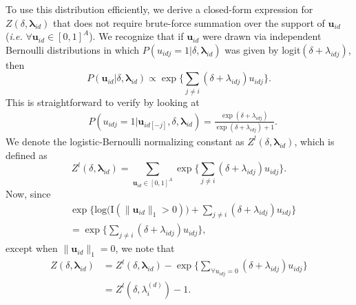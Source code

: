 \documentclass{article}
\begin{document}
 	 To use this distribution efficiently, we derive a closed-form expression for $Z(\delta,\boldsymbol{\lambda}_{id})$ that does not require brute-force summation over the support of $\boldsymbol{u}_{id}$ (\textit{i.e.} $\forall \boldsymbol{u}_{id} \in [0,1]^A$). We recognize that if $\boldsymbol{u}_{id}$ were drawn via independent Bernoulli distributions in which $P({u}_{idj}=1|\delta, \boldsymbol{\lambda}_{id})$ was given by logit$(\delta+\lambda_{idj})$, then 
 	 \begin{equation*}
 	 	P(\boldsymbol{u}_{id}|\delta, \boldsymbol{\lambda}_{id}) \propto \exp\Big\{\sum_{j \neq i } (\delta+\lambda_{idj})u_{idj}\Big\}.  	 
 	 \end{equation*}
 	 This is straightforward to verify by looking at 
 	 \begin{equation*}
 	 	\begin{aligned}
 	 		&P(u_{idj}=1|\boldsymbol{u}_{id[-j]}, \delta, \boldsymbol{\lambda}_{id})
 	 		=\frac{ \exp{(\delta+\lambda_{idj})}}{\exp{(\delta+\lambda_{idj})} + 1}.\end{aligned}\end{equation*}
 	 We denote the logistic-Bernoulli normalizing constant as $Z^{l}(\delta,\boldsymbol{\lambda}_{id})$, which is defined as 
 	 \begin{equation*}
 	 	Z^{l}(\delta,\boldsymbol{\lambda}_{id})=\sum_{\boldsymbol{u}_{id} \in [0,1]^{A}} \exp\Big\{\sum_{j\neq i} (\delta+\lambda_{idj})u_{idj}\Big\}.
 	 \end{equation*}
 	 Now, since 
 	 \begin{equation*}
 	 	\begin{aligned}
 	 		&\exp\Big\{ \mbox{log}\Big(\text{I}(\lVert \boldsymbol{u}_{id} \rVert_1 > 0)\Big) + \sum_{j \neq i} (\delta+\lambda_{idj})u_{idj} \Big\}\\&= \exp\Big\{  \sum_{j \neq i} (\delta+\lambda_{idj})u_{idj} \Big\},
 	 	\end{aligned}
 	 \end{equation*}
 	 except when $\lVert \boldsymbol{u}_{id} \rVert_1=0$, we note that 
 	 \begin{equation*}
 	 	\begin{aligned}
 	 		Z(\delta,\boldsymbol{\lambda}_{id})& = Z^{l}(\delta,\boldsymbol{\lambda}_{id}) -\exp\Big\{ \sum\limits_{\forall u_{idj}=0}(\delta+\lambda_{idj})u_{idj} \Big\}
 	 		\\& = Z^{l}(\delta,\lambda_{i}^{(d)}) -  1.
 	 	\end{aligned}
 	 \end{equation*}
\end{document}
